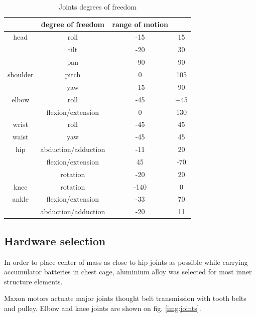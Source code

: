 \documentclass[letterpaper, 10 pt, conference]{ieeeconf}  %
\begin{document}
\begin{table}[thpb]
    \caption{Joints degrees of freedom}
    \label{table}
    \begin{center}
    \begin{tabular}{c | c c c}
        & degree of freedom & range of motion & \\
    \hline
        head & roll & -15 & 15 \\
            & tilt & -20 & 30 \\
            & pan & -90 & 90 \\
    \hline
        shoulder &  pitch & 0 & 105\\
                & yaw & -15 & 90\\
    \hline
        elbow & roll & -45 & +45 \\
                & flexion/extension & 0 & 130\\ 
    \hline
        wrist & roll & -45 & 45 \\
    \hline
        waist & yaw & -45 & 45 \\
    \hline
        hip & abduction/adduction & -11 & 20 \\
            & flexion/extension & 45 & -70 \\
            & rotation &-20 & 20\\
    \hline
        knee & rotation & -140 & 0 \\
    \hline
        ankle & flexion/extension & -33 & 70 \\
            & abduction/adduction & -20 & 11\\
    \end{tabular}
    \end{center}
\end{table}

\subsection{Hardware selection}
In order to place center of mass as close to hip joints as possible while
carrying accumulator batteries in chest cage, aluminium alloy was selected for
most inner structure elements. 

Maxon motors actuate major joints thought belt transmission with tooth belts and
pulley. Elbow and knee joints are shown on fig. \ref{img:joints}. 
\end{document}
